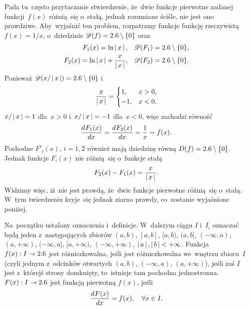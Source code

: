 \documentclass[a4paper,11pt]{article}
\begin{document}
\start {} Pada tu~często przytaczanie stwierdzenie, że~dwie
funkcje pierwotne zadanej funkcji~$f( x )$ różnią~się o~stałą, jednak
rozumiane ściśle, nie jest ono prawdziwe. Aby~wyjaśnić ten problem,
rozpatrzmy funkcje funkcję rzeczywistą $f( x ) = 1 / x$, o~dziedzinie
$\mathcal{D}( f ) = 2.6 \setminus \{  0  \}$ oraz
\begin{subequations}
  \begin{align}
    \label{eq:FichtenholzVolII-01a}
    F_{ 1 }( x )
    = \ln\left| \,  x  \, \right|, \quad &\mathcal{D}( F_{ 1 } ) = 2.6 \setminus \{  0  \}, \\
    \label{eq:FichtenholzVolII-01b}
    F_{ 2 }( x )
    = \ln\left| \,  x  \, \right| + \frac{ x }{ \left| \,  x  \, \right| },
    \quad &\mathcal{D}( F_{ 2 } ) = 2.6 \setminus \{  0  \}.
  \end{align}
\end{subequations}
Ponieważ $\mathcal{D}( x / \left| \,  x  \, \right| ) = 2.6 \setminus \{  0  \}$ i
\begin{equation}
  \label{eq:FichtenholzVolII-02}
  \frac{ x }{ \left| \,  x  \, \right| }
  =
  \begin{cases}
    1, &x > 0, \\
    -1, &x < 0.
  \end{cases}
\end{equation}
$x / \left| \,  x  \, \right| = 1$ dla~$x > 0$ i~$x / \left| \,  x  \, \right| = -1$ dla~$x < 0$,
więc zachodzi równość
\begin{equation}
  \label{eq:FichtenholzVolII-03}
  \frac{ d^{   } {  F_{ 1 }( x )  } }{ d {  x  }^{   } } = \frac{ d^{   } {  F_{ 2 }( x )  } }{ d {  x  }^{   } }
  = \frac{ 1 }{ x } = f( x ).
\end{equation}
Pochodne $F'_{ i }( x )$, $i = 1, 2$ również mają dziedzinę równą
$D( f ) = 2.6 \setminus \{  0  \}$. Jednak funkcje $F_{ i }( x )$ nie
różnią~się o~funkcje stałą
\begin{equation}
  \label{eq:FichtenholzVolII-04}
  F_{ 2 }( x ) - F_{ 1 }( x ) = \frac{ x }{ \left| \,  x  \, \right| }.
\end{equation}
Widzimy więc, iż~nie jest prawdą, że~dwie funkcje pierwotne różnią~się
o~stałą. W~tym twierdzeniu kryje~się jednak ziarno prawdy, co~zostanie
wyjaśnione poniżej.

Na~początku ustalany oznaczenia i~definicje. W~dalszym ciągu $I$
i~$I_{ \iota }$ oznaczać będą jeden z~następujących zbiorów
$( a, b )$, $[ a, b ]$, $[ a, b )$, $( a, b ]$, $( -\infty, a )$,
$( a, +\infty )$, $( -\infty, a ]$, $[ a, +\infty )$,
$( -\infty, +\infty )$, $\left| \,  a  \, \right|, \left| \,  b  \, \right| < +\infty$. Funkcja
$f( x ): I \to 2.6$ jest różniczkowalna, jeśli jest różniczkowalna
we~wnętrzu zbioru~$I$ (czyli jednym z~odcinków otwartych $( a, b )$,
$( -\infty, a )$, $( a, +\infty )$), jeśli zaś $I$ jest z~którejś
strony domknięty, to~istnieje tam pochodna jednostronna.
$F( x ): I \to 2.6$ jest funkcją pierwotną $f( x )$, jeśli
\begin{equation}
  \label{eq:FichtenholzVolII-05}
  \frac{ d^{   } {  F( x )  } }{ d {  x  }^{   } } = f( x ), \quad \forall x \in I.
\end{equation}
\end{document}
